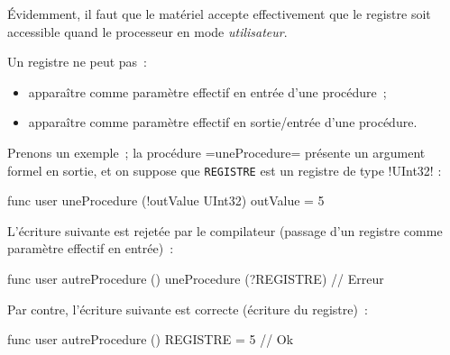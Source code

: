 Évidemment, il faut que le matériel accepte effectivement que le registre soit accessible quand le processeur en mode \emph{utilisateur}.










Un registre ne peut pas~:
\begin{itemize}
  \item apparaître comme paramètre effectif en entrée d'une procédure~;
  \item apparaître comme paramètre effectif en sortie/entrée d'une procédure.
\end{itemize}

Prenons un exemple~; la procédure \omnibus=uneProcedure= présente un argument formel en sortie, et on suppose que \texttt{REGISTRE} est un registre de type \omnibus!UInt32! :
\begin{OMNIBUS}
func user uneProcedure (!outValue UInt32) {
  outValue = 5
}
\end{OMNIBUS}



L'écriture suivante est rejetée par le compilateur (passage d'un registre comme paramètre effectif en entrée)~:
\begin{OMNIBUS}
func user autreProcedure () {
  uneProcedure (?REGISTRE) // Erreur
}
\end{OMNIBUS}

Par contre, l'écriture suivante est correcte (écriture du registre)~:
\begin{OMNIBUS}
func user autreProcedure () {
  REGISTRE = 5 // Ok
}
\end{OMNIBUS}

